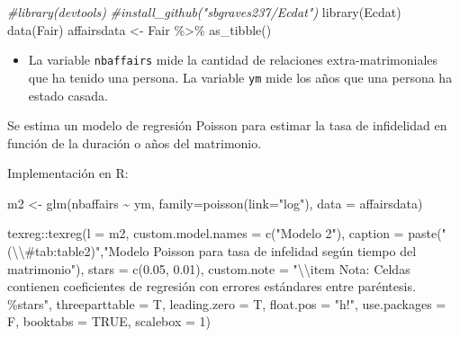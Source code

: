 \documentclass[
  12pt,
  a4paper,
]{article}
\newenvironment{Shaded}{\begin{snugshade}}{\end{snugshade}}
\newcommand{\AttributeTok}[1]{\textcolor[rgb]{0.77,0.63,0.00}{#1}}
\newcommand{\CommentTok}[1]{\textcolor[rgb]{0.56,0.35,0.01}{\textit{#1}}}
\newcommand{\ConstantTok}[1]{\textcolor[rgb]{0.00,0.00,0.00}{#1}}
\newcommand{\DecValTok}[1]{\textcolor[rgb]{0.00,0.00,0.81}{#1}}
\newcommand{\FloatTok}[1]{\textcolor[rgb]{0.00,0.00,0.81}{#1}}
\newcommand{\FunctionTok}[1]{\textcolor[rgb]{0.00,0.00,0.00}{#1}}
\newcommand{\NormalTok}[1]{#1}
\newcommand{\OtherTok}[1]{\textcolor[rgb]{0.56,0.35,0.01}{#1}}
\newcommand{\SpecialCharTok}[1]{\textcolor[rgb]{0.00,0.00,0.00}{#1}}
\newcommand{\StringTok}[1]{\textcolor[rgb]{0.31,0.60,0.02}{#1}}
\providecommand{\tightlist}{%
  \setlength{\itemsep}{0pt}\setlength{\parskip}{0pt}}
\begin{document}
\begin{Shaded}
\begin{Highlighting}[]
\CommentTok{\#library(devtools)}
\CommentTok{\#install\_github("sbgraves237/Ecdat")}
\FunctionTok{library}\NormalTok{(Ecdat)}
\FunctionTok{data}\NormalTok{(Fair)}
\NormalTok{affairsdata }\OtherTok{\textless{}{-}}\NormalTok{ Fair }\SpecialCharTok{\%\textgreater{}\%} \FunctionTok{as\_tibble}\NormalTok{()}
\end{Highlighting}
\end{Shaded}

\begin{itemize}
\tightlist
\item
  La variable \texttt{nbaffairs} mide la cantidad de relaciones extra-matrimoniales que ha tenido una persona. La variable \texttt{ym} mide los años que una persona ha estado casada.
\end{itemize}

Se estima un modelo de regresión Poisson para estimar la tasa de infidelidad en función de la duración o años del matrimonio.

Implementación en R:

\begin{Shaded}
\begin{Highlighting}[]
\NormalTok{m2 }\OtherTok{\textless{}{-}} \FunctionTok{glm}\NormalTok{(nbaffairs }\SpecialCharTok{\textasciitilde{}}\NormalTok{ ym, }\AttributeTok{family=}\FunctionTok{poisson}\NormalTok{(}\AttributeTok{link=}\StringTok{"log"}\NormalTok{), }\AttributeTok{data =}\NormalTok{ affairsdata)}

\NormalTok{texreg}\SpecialCharTok{::}\FunctionTok{texreg}\NormalTok{(}\AttributeTok{l =}\NormalTok{ m2,}
               \AttributeTok{custom.model.names =} \FunctionTok{c}\NormalTok{(}\StringTok{"Modelo 2"}\NormalTok{),}
               \AttributeTok{caption =} \FunctionTok{paste}\NormalTok{(}\StringTok{"(}\SpecialCharTok{\textbackslash{}\textbackslash{}}\StringTok{\#tab:table2)"}\NormalTok{,}\StringTok{"Modelo Poisson para tasa de infelidad según tiempo del matrimonio"}\NormalTok{),}
               \AttributeTok{stars =} \FunctionTok{c}\NormalTok{(}\FloatTok{0.05}\NormalTok{, }\FloatTok{0.01}\NormalTok{),}
               \AttributeTok{custom.note =} \StringTok{"}\SpecialCharTok{\textbackslash{}\textbackslash{}}\StringTok{item Nota: Celdas contienen coeficientes de regresión con errores estándares entre paréntesis. \%stars"}\NormalTok{,}
               \AttributeTok{threeparttable =}\NormalTok{ T,}
               \AttributeTok{leading.zero =}\NormalTok{ T,}
               \AttributeTok{float.pos =} \StringTok{"h!"}\NormalTok{,}
               \AttributeTok{use.packages =}\NormalTok{ F,}
               \AttributeTok{booktabs =} \ConstantTok{TRUE}\NormalTok{,}
               \AttributeTok{scalebox =} \DecValTok{1}\NormalTok{)}
\end{Highlighting}
\end{Shaded}
\end{document}
